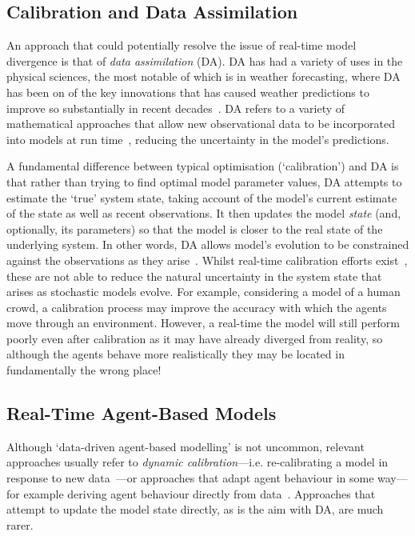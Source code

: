\documentclass{article}
\begin{document}
\subsection{Calibration and Data Assimilation}

An approach that could potentially resolve the issue of real-time model divergence is that of \textit{data assimilation} (DA). DA has had a variety of uses in the physical sciences, the most notable of which is in weather forecasting, where DA has been on of the key innovations that has caused weather predictions to improve so substantially in recent decades~\citep{kalnay_atmospheric_2003}. DA refers to a variety of mathematical approaches that allow new observational data to be incorporated into models at run time~\citep{lewis_dynamic_2006}, reducing the uncertainty in the model's predictions. 

A fundamental difference between typical optimisation (`calibration') and DA is that rather than trying to find optimal model parameter values, DA attempts to estimate the `true' system state, taking account of the model's current estimate of the state as well as recent observations. It then updates the model \textit{state} (and, optionally, its parameters) so that the model is closer to the real state of the underlying system. In other words, DA allows model’s evolution to be constrained against the observations as they arise~\citep{ward_dynamic_2016}. Whilst real-time calibration efforts exist~\citep[e.g.][]{oloo_predicting_2018}, these are not able to reduce the natural uncertainty in the system state that arises as stochastic models evolve. For example, considering a model of a human crowd, a calibration process may improve the accuracy with which the agents move through an environment. However, a real-time the model will still perform poorly even after calibration as it may have already diverged from reality, so although the agents behave more realistically they may be located in fundamentally the wrong place!

\subsection{Real-Time Agent-Based Models}

Although `data-driven agent-based modelling' is not uncommon, relevant approaches usually refer to \textit{dynamic calibration}---i.e. re-calibrating a model in response to new data~\cite[e.g.][]{oloo_predicting_2018}---or approaches that adapt agent behaviour in some way---for example deriving agent behaviour directly from data~\citep{zhang_datadriven_2015}. Approaches that attempt to update the model state directly, as is the aim with DA, are much rarer. 
\end{document}
